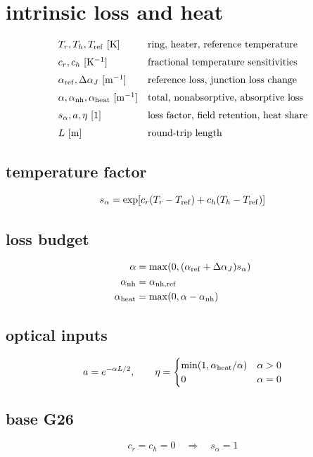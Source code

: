 \section*{intrinsic loss and heat}
\[
\begin{array}{ll}T_r,T_h,T_{\rm ref}\ [\mathrm K]&\text{ring, heater, reference temperature}\\[0.6em]c_r,c_h\ [\mathrm{K^{-1}}]&\text{fractional temperature sensitivities}\\[0.6em]\alpha_{\rm ref},\Delta\alpha_J\ [\mathrm{m^{-1}}]&\text{reference loss, junction loss change}\\[0.6em]\alpha,\alpha_{\rm nh},\alpha_{\rm heat}\ [\mathrm{m^{-1}}]&\text{total, nonabsorptive, absorptive loss}\\[0.6em]s_\alpha,a,\eta\ [1]&\text{loss factor, field retention, heat share}\\[0.6em]L\ [\mathrm m]&\text{round-trip length}\end{array}
\]
\subsection*{temperature factor}
\[
\displaystyle s_\alpha=\exp\!\left[c_r(T_r-T_{\rm ref})+c_h(T_h-T_{\rm ref})\right]
\]
\subsection*{loss budget}
\[
\displaystyle \begin{aligned}\alpha&=\max\!\left(0,(\alpha_{\rm ref}+\Delta\alpha_J)s_\alpha\right)\\\alpha_{\rm nh}&=\alpha_{\rm nh,ref}\\\alpha_{\rm heat}&=\max(0,\alpha-\alpha_{\rm nh})\end{aligned}
\]
\subsection*{optical inputs}
\[
\displaystyle a=e^{-\alpha L/2},\qquad\eta=\begin{cases}\min(1,\alpha_{\rm heat}/\alpha)&\alpha>0\\0&\alpha=0\end{cases}
\]
\subsection*{base G26}
\[
\displaystyle c_r=c_h=0\quad\Longrightarrow\quad s_\alpha=1
\]
